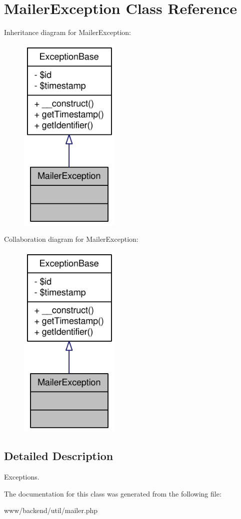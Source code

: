 \hypertarget{classMailerException}{
\section{MailerException Class Reference}
\label{classMailerException}
}


Inheritance diagram for MailerException:\nopagebreak
\begin{figure}[H]
\begin{center}
\leavevmode
\includegraphics[width=136pt]{classMailerException__inherit__graph}
\end{center}
\end{figure}


Collaboration diagram for MailerException:\nopagebreak
\begin{figure}[H]
\begin{center}
\leavevmode
\includegraphics[width=136pt]{classMailerException__coll__graph}
\end{center}
\end{figure}


\subsection{Detailed Description}
Exceptions. 

The documentation for this class was generated from the following file:\begin{DoxyCompactItemize}
\item 
www/backend/util/mailer.php\end{DoxyCompactItemize}
